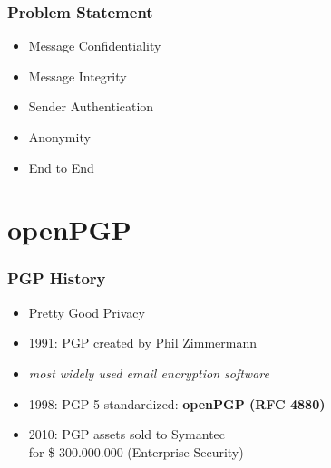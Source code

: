 \documentclass{beamer}
\begin{document}

%	
%


\begin{frame}
	\frametitle{Problem Statement}

	\begin{itemize}
		\item Message Confidentiality
		\item Message Integrity
		\item Sender Authentication
		\item Anonymity
	\end{itemize}

	\begin{itemize}
		\item End to End
	\end{itemize}

\end{frame}

\section{openPGP}


\begin{frame}
	\frametitle{PGP History}

	\begin{itemize}
		\item Pretty Good Privacy
		\item 1991: PGP created by Phil Zimmermann 
		\item \textit{most widely used email encryption software} \cite{zimmermann}
		\item 1998: PGP 5 standardized: \textbf{openPGP (RFC 4880)}
		\item 2010: PGP assets sold to Symantec \\ for \$ 300.000.000 (Enterprise Security)
	\end{itemize}
	

\end{frame}
\end{document}
